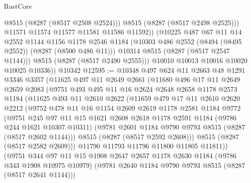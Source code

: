 \begin{lexlean}{RustCore}
\begin{coremodule}
                  @8515
                  (@8287 (@8517 @2508 @2524)))
                @8515
                (@8287 (@8517 @2498 @2525)))
              @11571
              @11574
              @11577
              @11581
              @11586
              @11592))
          (@10225
            @487
            @67
            @11
            @14
            @2552
            @1144
            @1156
            @1178
            @2546
            @1184
            (@10303 @486 @2552 (@8494 (@8495 @2552)) (@8287 (@8500 @486 @11)))
            @10314
            @8515
            (@8287 (@8517 @2547 @1144)))
          @8515
          (@8287 (@8517 @2490 @2555)))
        @10010
        @10013
        @10016
        @10020
        @10025
        @10336))
    @10342
@12595 := @10348
    @497
    @624
    @11
    @2663
    @48
    @1291
    @3346
    @3357
    (@11625
      @497
      @11
      @2649
      @2661
      (@11680
        @496
        @17
        @11
        @2649
        @2659
        @2083
        (@9751
          @493
          @495
          @11
          @16
          @2624
          @2648
          @2658
          @1178
          @2573
          @1184
          (@11625
            @493
            @11
            @2610
            @2622
            (@11659
              @479
              @17
              @11
              @2610
              @2620
              @2212
              (@9752
                @478
                @11
                @16
                @1154
                @2609
                @2619
                @1178
                @2581
                @1184
                @9772
                (@9751
                  @245
                  @97
                  @11
                  @15
                  @1621
                  @2608
                  @2618
                  @1178
                  @2591
                  @1184
                  (@9786 @244 @1621 @10307 @10311)
                  (@9781 @2601 @1184 @9790 @9793 @8515 (@8287 (@8517 @2602 @1144)))
                  @8515
                  (@8287 (@8517 @2592 @2608)))
                @8515
                (@8287 (@8517 @2582 @2609)))
              @11790
              @11793
              @11796
              @11800
              @11805
              @11811))
          (@9751
            @344
            @97
            @11
            @15
            @1908
            @2647
            @2657
            @1178
            @2630
            @1184
            (@9786 @343 @1908 @10975 @10979)
            (@9781 @2640 @1184 @9790 @9793 @8515 (@8287 (@8517 @2641 @1144)))

\end{coremodule}
\end{lexlean}
